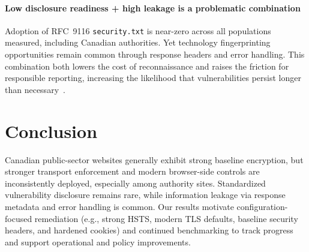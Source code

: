 \documentclass[conference]{IEEEtran}
\begin{document}
\paragraph{Low disclosure readiness + high leakage is a problematic combination}
Adoption of RFC~9116 \texttt{security.txt} is near-zero across all populations measured, including Canadian authorities. Yet technology fingerprinting opportunities remain common through response headers and error handling. This combination both lowers the cost of reconnaissance and raises the friction for responsible reporting, increasing the likelihood that vulnerabilities persist longer than necessary~\cite{rfc9116,cwe_209,owasp_secure_headers_project}.


\section{Conclusion}
Canadian public-sector websites generally exhibit strong baseline encryption, but stronger transport enforcement and modern browser-side controls are inconsistently deployed, especially among authority sites. Standardized vulnerability disclosure remains rare, while information leakage via response metadata and error handling is common. 
Our results motivate configuration-focused remediation (e.g., strong HSTS, modern TLS defaults, baseline security headers, and hardened cookies) and continued benchmarking to track progress and support operational and policy improvements.
\end{document}
